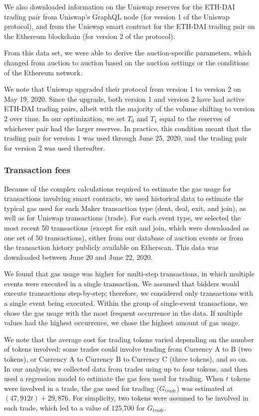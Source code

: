 \documentclass[conference]{IEEEtran}
\begin{document}
We also downloaded information on the Uniswap reserves for the ETH-DAI trading pair from Uniswap's GraphQL node \cite{uniswapV1} (for version 1 of the Uniswap protocol), and from the Uniswap smart contract for the ETH-DAI trading pair on the Ethereum blockchain \cite{uniswapV2} (for version 2 of the protocol).

From this data set, we were able to derive the auction-specific parameters, which changed from auction to auction based on the auction settings or the conditions of the Ethereum network.

We note that Uniswap upgraded their protocol from version 1 to version 2 on May 19, 2020. Since the upgrade, both version 1 and version 2 have had active ETH-DAI trading pairs, albeit with the majority of the volume shifting to version 2 over time. In our optimization, we set $T_0$ and $T_1$ equal to the reserves of whichever pair had the larger reserves. In practice, this condition meant that the trading pair for version 1 was used through June 25, 2020, and the trading pair for version 2 was used thereafter.

\subsubsection{Transaction fees} Because of the complex calculations required to estimate the gas usage for transactions involving smart contracts, we used historical data to estimate the typical gas used for each Maker transaction type (dent, deal, exit, and join), as well as for Uniswap transactions (trade). For each event type, we selected the most recent 50 transactions (except for exit and join, which were downloaded as one set of 50 transactions), either from our database of auction events or from the transaction history publicly available on Etherscan. This data was downloaded between June 20 and June 22, 2020.

We found that gas usage was higher for multi-step transactions, in which multiple events were executed in a single transaction. We assumed that bidders would execute transactions step-by-step; therefore, we considered only transactions with a single event being executed. Within the group of single-event transactions, we chose the gas usage with the most frequent occurrence in the data. If multiple values had the highest occurrence, we chose the highest amount of gas usage.

We note that the average cost for trading tokens varied depending on the number of tokens involved; some trades could involve trading from Currency A to B (two tokens), or Currency A to Currency B to Currency C (three tokens), and so on. In our analysis, we collected data from trades using up to four tokens, and then used a regression model to estimate the gas fees used for trading. When $t$ tokens were involved in a trade, the gas used for trading ($G_{trade}$) was estimated at $(47,912 t) + 29,876$. For simplicity, two tokens were assumed to be involved in each trade, which led to a value of 125,700 for $G_{trade}$.
\end{document}
